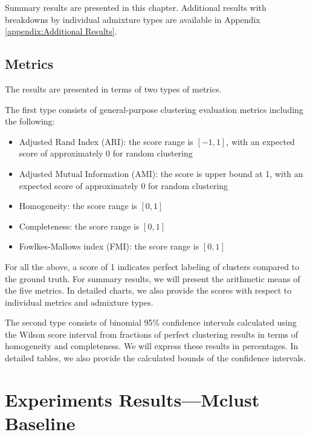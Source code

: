 Summary results are presented in this chapter. Additional results with breakdowns by individual admixture types are available in Appendix \ref{appendix:Additional Results}.

\subsection{Metrics}

The results are presented in terms of two types of metrics.

The first type consists of general-purpose clustering evaluation metrics including the following:

\begin{itemize}
  \item Adjusted Rand Index (ARI): the score range is $[-1, 1]$, with an expected score of approximately 0 for random clustering
  \item Adjusted Mutual Information (AMI): the score is upper bound at 1, with an expected score of approximately 0 for random clustering
  \item Homogeneity: the score range is $[0, 1]$
  \item Completeness: the score range is $[0, 1]$
  \item Fowlkes-Mallows index (FMI): the score range is $[0, 1]$
\end{itemize}

For all the above, a score of 1 indicates perfect labeling of clusters compared to the ground truth. For summary results, we will present the arithmetic means of the five metrics. In detailed charts, we also provide the scores with respect to individual metrics and admixture types.

The second type consists of binomial 95\% confidence intervals calculated using the Wilson score interval from fractions of perfect clustering results in terms of homogeneity and completeness. We will express these results in percentages. In detailed tables, we also provide the calculated bounds of the confidence intervals.

\section{Experiments Results---Mclust Baseline}

